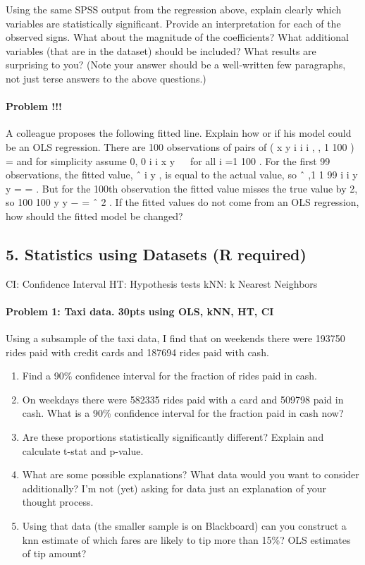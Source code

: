 \documentclass[]{article}
\providecommand{\tightlist}{%
  \setlength{\itemsep}{0pt}\setlength{\parskip}{0pt}}
\let\oldparagraph\paragraph
\renewcommand{\paragraph}[1]{\oldparagraph{#1}\mbox{}}
\begin{document}
Using the same SPSS output from the regression above, explain clearly
which variables are statistically significant. Provide an interpretation
for each of the observed signs. What about the magnitude of the
coefficients? What additional variables (that are in the dataset) should
be included? What results are surprising to you? (Note your answer
should be a well-written few paragraphs, not just terse answers to the
above questions.)

\paragraph{Problem !!!}\label{problem-16}

A colleague proposes the following fitted line. Explain how or if his
model could be an OLS regression. There are 100 observations of pairs of
( x y i i i , , 1 100 ) = and for simplicity assume 0, 0 i i x y   for
all i =1 100 . For the first 99 observations, the fitted value, ˆ i y ,
is equal to the actual value, so ˆ ,1 1 99 i i y y = = . But for the
100th observation the fitted value misses the true value by 2, so 100
100 y y − = ˆ 2 . If the fitted values do not come from an OLS
regression, how should the fitted model be changed?

\subsection{5. Statistics using Datasets (R
required)}\label{statistics-using-datasets-r-required}

CI: Confidence Interval HT: Hypothesis tests kNN: k Nearest Neighbors

\paragraph{Problem 1: Taxi data. 30pts using OLS, kNN, HT,
CI}\label{problem-1-taxi-data.-30pts-using-ols-knn-ht-ci}

Using a subsample of the taxi data, I find that on weekends there were
193750 rides paid with credit cards and 187694 rides paid with cash.

\begin{enumerate}
\def\labelenumi{\alph{enumi}.}
\tightlist
\item
  Find a 90\% confidence interval for the fraction of rides paid in
  cash.
\item
  On weekdays there were 582335 rides paid with a card and 509798 paid
  in cash. What is a 90\% confidence interval for the fraction paid in
  cash now?
\item
  Are these proportions statistically significantly different? Explain
  and calculate t-stat and p-value.
\item
  What are some possible explanations? What data would you want to
  consider additionally? I'm not (yet) asking for data just an
  explanation of your thought process.
\item
  Using that data (the smaller sample is on Blackboard) can you
  construct a knn estimate of which fares are likely to tip more than
  15\%? OLS estimates of tip amount?
\end{enumerate}
\end{document}
